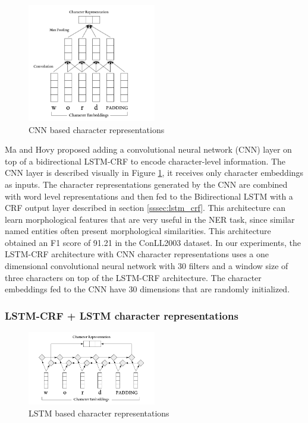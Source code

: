 \documentclass[sigconf]{acmart}
\begin{document}
\begin{figure}
  \centering
	  \includegraphics[width=0.5\textwidth]{pics/cnn}
  \caption{CNN based character representations}
  \label{fig:cnn}
\end{figure}

Ma and Hovy \cite{Ma2016} proposed adding a convolutional neural network (CNN) layer 
on top of a bidirectional LSTM-CRF to encode character-level information. The CNN
layer is described visually in Figure \ref{fig:cnn}, it receives
only character embeddings as inputs. The character representations generated by the CNN 
are combined with word level representations and then fed to the Bidirectional LSTM with
a CRF output layer described in section \ref{sssec:lstm_crf}.
This architecture can learn morphological features that are very
useful in the NER task, since similar named entities often present morphological similarities. 
This architecture obtained an F1 score of 91.21 in the ConLL2003 dataset. In our experiments, 
the LSTM-CRF architecture with CNN character representations uses a one dimensional convolutional 
neural network with 30 filters and a window size of three characters on top of the LSTM-CRF architecture.
The character embeddings fed to the CNN have 30 dimensions that are randomly initialized.

\subsubsection{LSTM-CRF + LSTM character representations}

\begin{figure}
  \centering
  \includegraphics[width=0.5\textwidth]{pics/lstm_char_representations}
  \caption{LSTM based character representations}
  \label{fig:lstm_char}
\end{figure}
\end{document}
